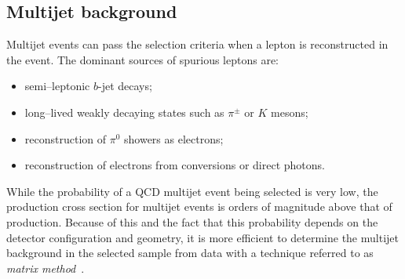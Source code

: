 \subsection{Multijet background}
\label{sec:qcdbckg}

Multijet events can pass the selection criteria when a lepton is
reconstructed in the event. The dominant sources of spurious leptons
are:
\begin{itemize}
\item semi--leptonic $b$-jet decays;
\item long--lived weakly decaying states such as $\pi^{\pm}$ or $K$
  mesons;
\item reconstruction of $\pi^0$ showers as electrons;
\item reconstruction of electrons from conversions or direct photons.
\end{itemize}

While the probability of a QCD multijet event being selected is very
low, the production cross section for multijet events is orders of
magnitude above that of \ttbar{} production.
Because of this and the fact that this probability depends on the
detector configuration and geometry, it is more efficient to
determine the multijet background in the selected sample from data
with a technique referred to as {\it matrix method}~\cite{matrixmethod}.

